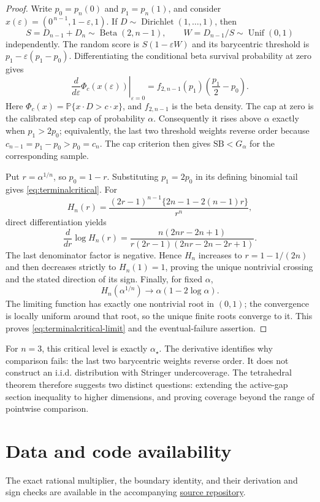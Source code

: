 \documentclass[11pt]{article}
\theoremstyle{definition}
\newcommand{\SB}{\mathrm{SB}}
\newcommand{\pr}{\mathbb{P}}
\begin{document}
\begin{proof}
Write $p_0=p_n(0)$ and $p_1=p_n(1)$, and consider
$x(\varepsilon)=(0^{\,n-1},1-\varepsilon,1)$.  If
$D\sim\operatorname{Dirichlet}(1,\ldots,1)$, then
\[
 S=D_{n-1}+D_n\sim\operatorname{Beta}(2,n-1),\qquad
 W=D_{n-1}/S\sim\operatorname{Unif}(0,1)
\]
independently.  The random score is $S(1-\varepsilon W)$ and its barycentric
threshold is $p_1-\varepsilon(p_1-p_0)$.  Differentiating the conditional
beta survival probability at zero gives
\begin{equation}\label{eq:terminalderivative}
 \left.\frac{d}{d\varepsilon}\Phi_c(x(\varepsilon))
 \right|_{\varepsilon=0}
 =f_{2,n-1}(p_1)\left(\frac{p_1}{2}-p_0\right).
\end{equation}
Here $\Phi_c(x)=\pr\{x\mathbin{\cdot}D>c\mathbin{\cdot}x\}$,
and $f_{2,n-1}$ is the beta density. The cap at zero is the calibrated
step cap of probability $\alpha$.
Consequently it rises above $\alpha$ exactly when $p_1>2p_0$; equivalently,
the last two threshold weights reverse order because
$c_{n-1}=p_1-p_0>p_0=c_n$.  The cap criterion then gives
$\SB<G_\alpha$ for the corresponding sample.

Put $r=\alpha^{1/n}$, so $p_0=1-r$.  Substituting $p_1=2p_0$ in its
defining binomial tail gives \eqref{eq:terminalcritical}.  For
\[
 H_n(r)=\frac{(2r-1)^{n-1}\{2n-1-2(n-1)r\}}{r^n},
\]
direct differentiation yields
\[
 \frac{d}{dr}\log H_n(r)
 =\frac{n(2nr-2n+1)}
 {r(2r-1)(2nr-2n-2r+1)}.
\]
The last denominator factor is negative.  Hence $H_n$ increases to
$r=1-1/(2n)$ and then decreases strictly to $H_n(1)=1$, proving the unique
nontrivial crossing and the stated direction of its sign.  Finally, for
fixed $\alpha$,
\[
 H_n(\alpha^{1/n})\longrightarrow
 \alpha(1-2\log\alpha).
\]
The limiting function has exactly one nontrivial root in $(0,1)$; the
convergence is locally uniform around that root, so the unique finite roots
converge to it.  This proves \eqref{eq:terminalcritical-limit}
and the eventual-failure assertion.
\end{proof}


For $n=3$, this critical level is exactly $\alpha_\star$.
The derivative identifies why comparison fails: the last two barycentric
weights reverse order. It does not construct an i.i.d. distribution with
Stringer undercoverage. The tetrahedral theorem therefore suggests two
distinct questions: extending the active-gap section inequality to higher
dimensions, and proving coverage beyond the range of pointwise comparison.

\section*{Data and code availability}
The exact rational multiplier, the boundary identity, and their derivation
and sign checks are available in the accompanying
\href{https://github.com/RichieSater/stringer-bound}{source repository}.
\end{document}
